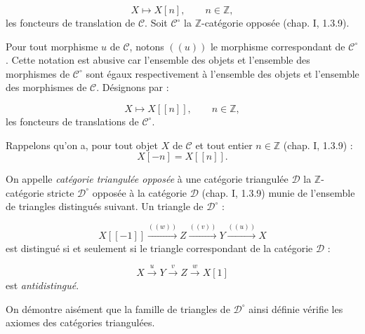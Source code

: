 \[
  X\longmapsto X[n],\qquad n\in\mathbb Z,
\]
les foncteurs de translation de $\mathcal C$. Soit $\mathcal C^\circ$ la
$\mathbb Z$-catégorie opposée (chap. I, 1.3.9).

Pour tout morphisme $u$ de $\mathcal C$, notons $((u))$ le morphisme
correspondant de $\mathcal C^\circ$. Cette notation est abusive car
l'ensemble des objets et l'ensemble des morphismes de $\mathcal C^\circ$
sont égaux respectivement à l'ensemble des objets et l'ensemble des
morphismes de $\mathcal C$. Désignons par :

\[
  X\longmapsto X[[n]],\qquad n\in\mathbb Z,
\]
les foncteurs de translations de $\mathcal C^\circ$.

Rappelons qu'on a, pour tout objet $X$ de $\mathcal C$ et tout entier
$n\in\mathbb Z$ (chap. I, 1.3.9) :
\[
  X[-n]=X[[n]].
\]

On appelle \emph{catégorie triangulée opposée} à une catégorie triangulée
$\mathcal D$ la $\mathbb Z$-catégorie stricte $\mathcal D^\circ$ opposée
à la catégorie $\mathcal D$ (chap. I, 1.3.9) munie de l'ensemble de
triangles distingués suivant. Un triangle de $\mathcal D^\circ$ :

\[
  X[[-1]]\xrightarrow{((w))}Z\xrightarrow{((v))}Y
  \xrightarrow{((u))}X
\]
est distingué si et seulement si le triangle correspondant de la catégorie
$\mathcal D$ :

\[
  X\xrightarrow{u}Y\xrightarrow{v}Z\xrightarrow{w}X[1]
\]
est \emph{antidistingué}.

On démontre aisément que la famille de triangles de $\mathcal D^\circ$
ainsi définie vérifie les axiomes des catégories triangulées.
\endgroup

